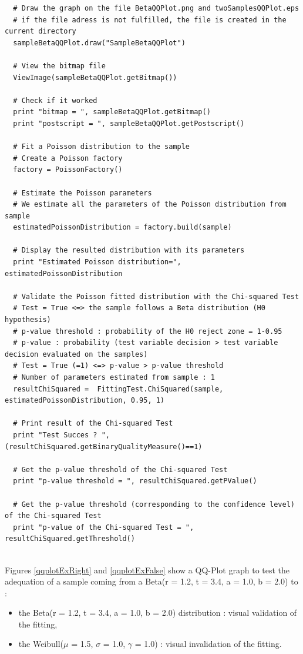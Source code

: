 \begin{lstlisting}
  # Draw the graph on the file BetaQQPlot.png and twoSamplesQQPlot.eps
  # if the file adress is not fulfilled, the file is created in the current directory
  sampleBetaQQPlot.draw("SampleBetaQQPlot")

  # View the bitmap file
  ViewImage(sampleBetaQQPlot.getBitmap())

  # Check if it worked
  print "bitmap = ", sampleBetaQQPlot.getBitmap()
  print "postscript = ", sampleBetaQQPlot.getPostscript()

  # Fit a Poisson distribution to the sample
  # Create a Poisson factory
  factory = PoissonFactory()

  # Estimate the Poisson parameters
  # We estimate all the parameters of the Poisson distribution from sample
  estimatedPoissonDistribution = factory.build(sample)

  # Display the resulted distribution with its parameters
  print "Estimated Poisson distribution=", estimatedPoissonDistribution

  # Validate the Poisson fitted distribution with the Chi-squared Test
  # Test = True <=> the sample follows a Beta distribution (H0 hypothesis)
  # p-value threshold : probability of the H0 reject zone = 1-0.95
  # p-value : probability (test variable decision > test variable decision evaluated on the samples)
  # Test = True (=1) <=> p-value > p-value threshold
  # Number of parameters estimated from sample : 1
  resultChiSquared =  FittingTest.ChiSquared(sample, estimatedPoissonDistribution, 0.95, 1)

  # Print result of the Chi-squared Test
  print "Test Succes ? ", (resultChiSquared.getBinaryQualityMeasure()==1)

  # Get the p-value threshold of the Chi-squared Test
  print "p-value threshold = ", resultChiSquared.getPValue()

  # Get the p-value threshold (corresponding to the confidence level) of the Chi-squared Test
  print "p-value of the Chi-squared Test = ", resultChiSquared.getThreshold()
\end{lstlisting}
\textspace\\


Figures \ref{qqplotExRight} and \ref{qqplotExFalse} show a QQ-Plot graph to test the adequation of a sample coming from a Beta(r = 1.2, t = 3.4, a = 1.0, b = 2.0) to :
\begin{itemize}
\item the Beta(r = 1.2, t = 3.4, a = 1.0, b = 2.0) distribution : visual validation of the fitting,
\item the Weibull($\mu$ = 1.5, $\sigma$ = 1.0, $\gamma$ = 1.0) : visual invalidation of the fitting.
\end{itemize}




